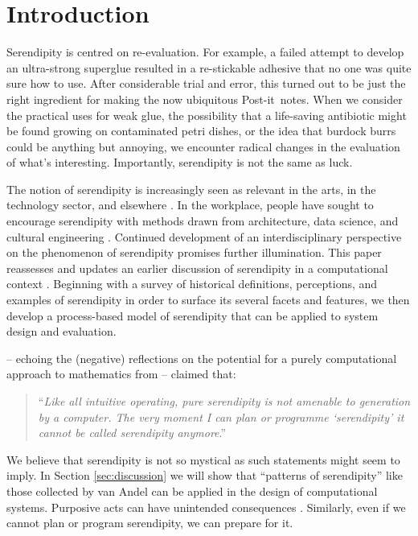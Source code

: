 \section{Introduction}

Serendipity is centred on re-evaluation.  For example, a failed
attempt to develop an ultra-strong superglue resulted in a
re-stickable adhesive that no one was quite sure how to use.  After
considerable trial and error, this turned out to be just the right
ingredient for making the now ubiquitous Post-it\texttrademark\ notes.
%
%
When we consider the practical uses for weak glue, the possibility
that a life-saving antibiotic might be found growing on contaminated
petri dishes, or the idea that burdock burrs could be anything but
annoying, we encounter radical changes in the evaluation of what's
interesting.  Importantly, serendipity is not the same as luck. 

The notion of serendipity is increasingly seen as relevant in the arts, in the technology sector,
and elsewhere \cite{mckay-serendipity,rao2015breaking,kennedy2016inventology}.  In the workplace, people have sought to encourage
serendipity with methods drawn from architecture, data science, and
cultural engineering
\cite{kakko2009homo,engineering-serendipity,who-moved-cube}.
Continued development of an interdisciplinary perspective on the
phenomenon of serendipity promises further illumination.  This paper
reassesses and updates an earlier discussion of serendipity in a
computational context \cite{pease2013discussion}.  Beginning with a
survey of historical definitions, perceptions, and examples of
serendipity in order to surface its several facets and features, we
then develop a process-based model of serendipity that can be applied
to system design and evaluation.

 -- echoing the
(negative) reflections on the potential
for a purely computational approach to mathematics from  -- claimed that:
\begin{quote}
``\emph{Like all intuitive operating, pure serendipity is not amenable
    to generation by a computer.  The very moment I can plan or
    programme `serendipity' it cannot be called serendipity
    anymore}.'' \cite[p.~646]{van1994anatomy}
\end{quote}
We believe that serendipity is not so mystical as such statements
might seem to imply.  In Section \ref{sec:discussion} we will show
that ``patterns of serendipity'' like those collected by van Andel can
be applied in the design of computational systems.  Purposive acts can
have unintended consequences \cite{merton1936unanticipated}.
Similarly, even if we cannot plan or program serendipity, we can
prepare for it.

